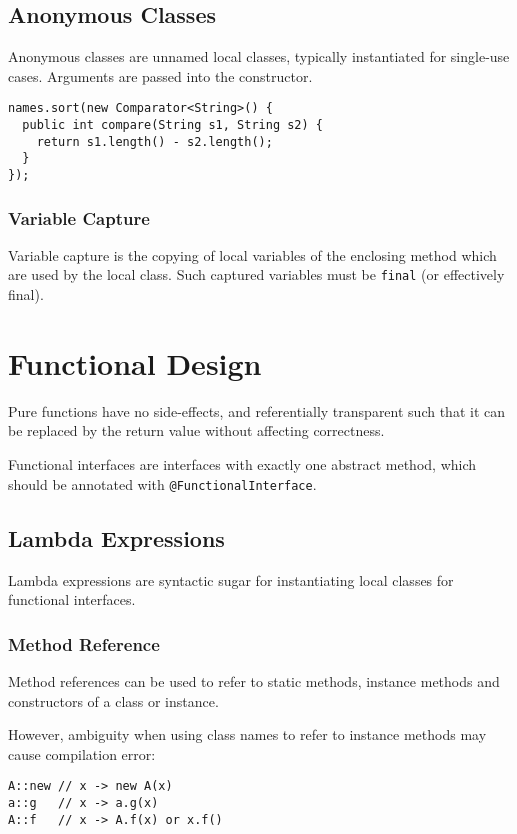 \documentclass[12pt, a4paper]{article}
\begin{document}
\begin{multicols*}{3}
\subsection{Anonymous Classes}
Anonymous classes are unnamed local classes, typically instantiated for single-use cases. Arguments are passed into the constructor.
\begin{lstlisting}
names.sort(new Comparator<String>() {
  public int compare(String s1, String s2) {
    return s1.length() - s2.length();
  }
});
\end{lstlisting}

\subsubsection{Variable Capture}
Variable capture is the copying of local variables of the enclosing method which are used by the local class. Such captured variables must be \lstinline|final| (or effectively final).
\begin{center}
\end{center}

\section{Functional Design}
Pure functions have no side-effects, and referentially transparent such that it can be replaced by the return value without affecting correctness.

Functional interfaces are interfaces with exactly one abstract method, which should be annotated with \lstinline|@FunctionalInterface|.

\subsection{Lambda Expressions}
Lambda expressions are syntactic sugar for instantiating local classes for functional interfaces.

\subsubsection{Method Reference}
Method references can be used to refer to static methods, instance methods and constructors of a class or instance.

However, ambiguity when using class names to refer to instance methods may cause compilation error:
\begin{lstlisting}
A::new // x -> new A(x)
a::g   // x -> a.g(x)  
A::f   // x -> A.f(x) or x.f() 
\end{lstlisting}


\end{multicols*}
\end{document}
